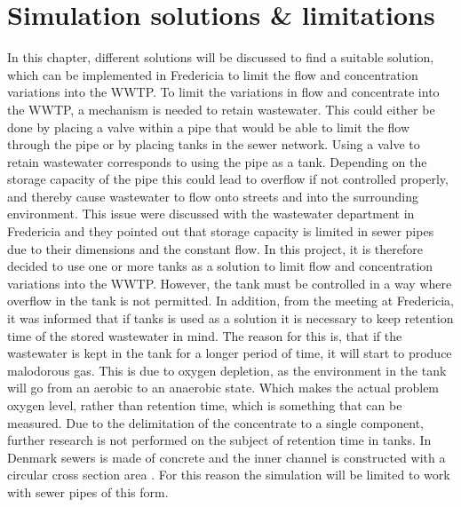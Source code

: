 
\chapter{Simulation solutions \& limitations }\label{ch:simulation_solution_and_limitation}
In this chapter, different solutions will be discussed to find a suitable solution, which can be implemented in Fredericia to limit the flow and concentration variations into the WWTP.
To limit the variations in flow and concentrate into the WWTP, a mechanism is needed to retain wastewater. This could either be done by placing a valve within a pipe that would be able to limit the flow through the pipe or by placing tanks in the sewer network.%
Using a valve to retain wastewater corresponds to using the pipe as a tank. Depending on the storage capacity of the pipe this could lead to overflow if not controlled properly, and thereby cause wastewater to flow onto streets and into the surrounding environment. %
This issue were discussed with the wastewater department in Fredericia and they pointed out that storage capacity is limited in sewer pipes due to their dimensions and the constant flow. 
In this project, it is therefore decided to use one or more tanks as a solution to limit flow and concentration variations into the WWTP. %
However, the tank must be controlled in a way where overflow in the tank is not permitted. %
In addition, from the meeting at Fredericia, it was informed that if tanks is used as a solution it is necessary to keep retention time of the stored wastewater in mind. The reason for this is, that if the wastewater is kept in the tank for a longer period of time, it will start to produce malodorous gas. This is due to oxygen depletion, as the environment in the tank will go from an aerobic to an anaerobic state. Which makes the actual problem oxygen level, rather than retention time, which is something that can be measured. Due to the delimitation of the concentrate to a single component, further research is not performed on the subject of retention time in tanks.
In Denmark sewers is made of concrete and the inner channel is constructed with a circular cross section area \cite{betonhaandbogen}. For this reason the simulation will be limited to work with sewer pipes of this form.


